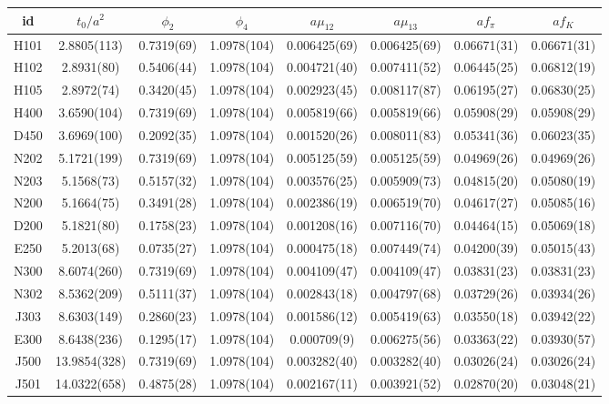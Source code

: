 \begin{sidewaystable}
\begin{center}
    \begin{tabular}{c c c c c c c c}
id & $t_0/a^2$ & $\phi_2$ & $\phi_4$ & $a\mu_{12}$ & $a\mu_{13}$ & $af_{\pi}$ & $af_K$ \\
\toprule
H101 & 2.8805(113) & 0.7319(69) & 1.0978(104) & 0.006425(69) & 0.006425(69) & 0.06671(31) & 0.06671(31) \\
H102 & 2.8931(80) & 0.5406(44) & 1.0978(104) & 0.004721(40) & 0.007411(52) & 0.06445(25) & 0.06812(19) \\
H105 & 2.8972(74) & 0.3420(45) & 1.0978(104) & 0.002923(45) & 0.008117(87) & 0.06195(27) & 0.06830(25) \\
\midrule
H400 & 3.6590(104) & 0.7319(69) & 1.0978(104) & 0.005819(66) & 0.005819(66) & 0.05908(29) & 0.05908(29) \\
D450 & 3.6969(100) & 0.2092(35) & 1.0978(104) & 0.001520(26) & 0.008011(83) & 0.05341(36) & 0.06023(35) \\
\midrule
N202 & 5.1721(199) & 0.7319(69) & 1.0978(104) & 0.005125(59) & 0.005125(59) & 0.04969(26) & 0.04969(26) \\
N203 & 5.1568(73) & 0.5157(32) & 1.0978(104) & 0.003576(25) & 0.005909(73) & 0.04815(20) & 0.05080(19) \\
N200 & 5.1664(75) & 0.3491(28) & 1.0978(104) & 0.002386(19) & 0.006519(70) & 0.04617(27) & 0.05085(16) \\
D200 & 5.1821(80) & 0.1758(23) & 1.0978(104) & 0.001208(16) & 0.007116(70) & 0.04464(15) & 0.05069(18) \\
E250 & 5.2013(68) & 0.0735(27) & 1.0978(104) & 0.000475(18) & 0.007449(74) & 0.04200(39) & 0.05015(43) \\
\midrule
N300 & 8.6074(260) & 0.7319(69) & 1.0978(104) & 0.004109(47) & 0.004109(47) & 0.03831(23) & 0.03831(23) \\
N302 & 8.5362(209) & 0.5111(37) & 1.0978(104) & 0.002843(18) & 0.004797(68) & 0.03729(26) & 0.03934(26) \\
J303 & 8.6303(149) & 0.2860(23) & 1.0978(104) & 0.001586(12) & 0.005419(63) & 0.03550(18) & 0.03942(22) \\
E300 & 8.6438(236) & 0.1295(17) & 1.0978(104) & 0.000709(9) & 0.006275(56) & 0.03363(22) & 0.03930(57) \\
\midrule
J500 & 13.9854(328) & 0.7319(69) & 1.0978(104) & 0.003282(40) & 0.003282(40) & 0.03026(24) & 0.03026(24) \\
J501 & 14.0322(658) & 0.4875(28) & 1.0978(104) & 0.002167(11) & 0.003921(52) & 0.02870(20) & 0.03048(21) \\

\end{tabular}
\end{center}
\end{sidewaystable}
